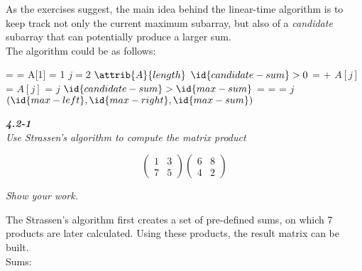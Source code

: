 \documentclass[8pt,a4paper]{article}
\begin{document}
	As the exercises suggest, the main idea behind the linear-time algorithm is
to keep track not only the current maximum subarray, but also of a \textit{candidate}
subarray that can potentially produce a larger sum. \\

	The algorithm could be as follows:

\begin{codebox}
  \li {} =  = A[1]
  \li {} = 1
  \li \For $j = 2$ \To $\attrib{A}{length}$
        \Do
  \li     \If $\id{candidate-sum} > 0$
            \Then
  \li         {} =  + $A[j]$
  \li       \Else
  \li         {} = $A[j]$
  \li         {} = $j$
            \End
  \li     \If $\id{candidate-sum} > \id{max-sum}$
            \Then
  \li         {} = 
  \li         {} = 
  \li         {} = $j$
            \End
          \End
  \li \Return $(\id{max-left}, \id{max-right}, \id{max-sum})$
\end{codebox}

\begin{framed}
\textbf{\textit{4.2-1}} \\
\textit{Use Strassen's algorithm to compute the matrix product}

\begin{equation*}
  \begin{pmatrix}
    1 & 3 \\
    7 & 5
  \end{pmatrix}
  \begin{pmatrix}
    6 & 8 \\
    4 & 2
  \end{pmatrix}
\end{equation*}

\textit{Show your work.}
\end{framed}

The Strassen's algorithm first creates a set of pre-defined sums, on which 7 products
are later calculated. Using these products, the result matrix can be built. \\

Sums:
\end{document}
